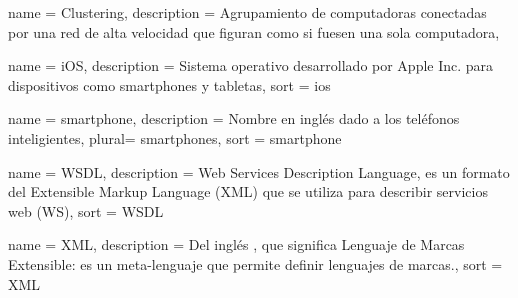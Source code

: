 \newpage

 {
  name = {Clustering},
  description = {Agrupamiento de computadoras conectadas por una red de alta velocidad que figuran como si fuesen una sola computadora},
}

 {
  name = {iOS},
  description = {Sistema operativo desarrollado por Apple Inc. para dispositivos
  como smartphones y tabletas}, sort = {ios}
}

 {
  name = {smartphone},
  description = {Nombre en inglés dado a los teléfonos inteligientes},
  plural= {smartphones},
  sort = {smartphone}
}

 {
  name = {WSDL},
  description = {Web Services Description Language, es un formato del Extensible Markup Language (XML) que se utiliza para describir servicios web (WS)},
  sort = {WSDL}
}

 {
  name = {XML},
  description = {Del inglés , que significa Lenguaje de Marcas Extensible: es un meta-lenguaje que permite definir lenguajes de marcas.},
  sort = {XML}
}




